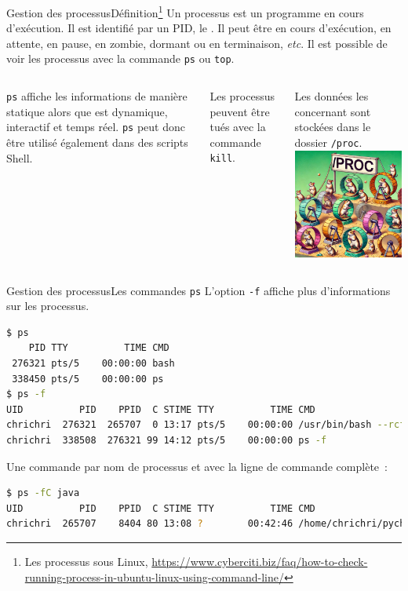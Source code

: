\documentclass{beamer}
\begin{document}
    \begin{frame}{Gestion des processus}{Définition\footnote{\label{process}Les processus sous Linux, \url{https://www.cyberciti.biz/faq/how-to-check-running-process-in-ubuntu-linux-using-command-line/}}}
        Un processus est un programme en cours d'exécution.
        Il est identifié par un PID, le .
        \bigbreak
        Il peut être en cours d'exécution, en attente, en pause, en zombie, dormant ou en terminaison, \textit{etc}.
        Il est possible de voir les processus avec la commande \lstinline{ps} ou \lstinline{top}.
        \bigbreak
        \begin{columns}
            \lstinline{ps} affiche les informations de manière statique alors que est dynamique, interactif et temps réel.
            \lstinline{ps} peut donc être utilisé également dans des scripts Shell.

            Les processus peuvent être tués avec la commande \lstinline{kill}.

            Les données les concernant sont stockées dans le dossier \lstinline{/proc}.
            \centering
            \includegraphics[width=4cm]{image/proc-hamster}
        \end{columns}
    \end{frame}

    \begin{frame}[fragile]{Gestion des processus}{Les commandes \lstinline{ps}}
        L'option \lstinline{-f} affiche plus d'informations sur les processus.
        \begin{lstlisting}[language=bash]
$ ps
    PID TTY          TIME CMD
 276321 pts/5    00:00:00 bash
 338450 pts/5    00:00:00 ps
$ ps -f
UID          PID    PPID  C STIME TTY          TIME CMD
chrichri  276321  265707  0 13:17 pts/5    00:00:00 /usr/bin/bash --rcfile /home/chrichri/pycharm-professional-2024.1.4/pycharm-2024.1.4/plugins/terminal/shell-integrations/bash/bash-integration.bash -i
chrichri  338508  276321 99 14:12 pts/5    00:00:00 ps -f
        \end{lstlisting}
        Une commande par nom de processus et avec la ligne de commande complète~:
        \begin{lstlisting}[language=bash]
$ ps -fC java
UID          PID    PPID  C STIME TTY          TIME CMD
chrichri  265707    8404 80 13:08 ?        00:42:46 /home/chrichri/pycharm...
        \end{lstlisting}
    \end{frame}
\end{document}
